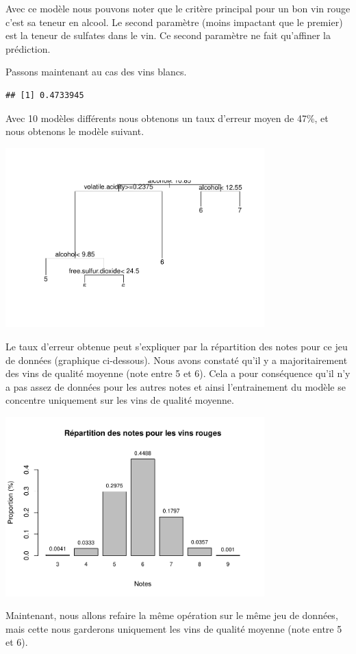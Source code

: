 \documentclass[
]{article}
\begin{document}
Avec ce modèle nous pouvons noter que le critère principal pour un bon
vin rouge c'est sa teneur en alcool. Le second paramètre (moins
impactant que le premier) est la teneur de sulfates dans le vin. Ce
second paramètre ne fait qu'affiner la prédiction.

Passons maintenant au cas des vins blancs.

\begin{verbatim}
## [1] 0.4733945
\end{verbatim}

Avec 10 modèles différents nous obtenons un taux d'erreur moyen de 47\%,
et nous obtenons le modèle suivant.

\begin{center}
	\includegraphics[width=10cm]{repport_files/figure-latex/unnamed-chunk-27-1.pdf}
\end{center}

Le taux d'erreur obtenue peut s'expliquer par la répartition des notes
pour ce jeu de données (graphique ci-dessous). Nous avons constaté qu'il
y a majoritairement des vins de qualité moyenne (note entre 5 et 6).
Cela a pour conséquence qu'il n'y a pas assez de données pour les autres
notes et ainsi l'entrainement du modèle se concentre uniquement sur les
vins de qualité moyenne.

\begin{center}
	\includegraphics[width=10cm]{repport_files/figure-latex/unnamed-chunk-28-1.pdf}
\end{center}
Maintenant, nous allons refaire la même opération sur le même jeu de
données, mais cette nous garderons uniquement les vins de qualité
moyenne (note entre 5 et 6).
\end{document}
